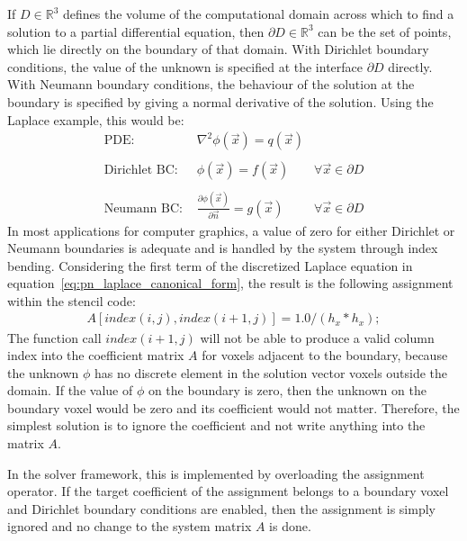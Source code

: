 If $D\in\mathbb{R}^3$ defines the volume of the computational domain across which to find a solution to a partial differential equation, then $\partial D\in\mathbb{R}^3$ can be the set of points, which lie directly on the boundary of that domain. With Dirichlet boundary conditions, the value of the unknown is specified at the interface $\partial D$ directly. With Neumann boundary conditions, the behaviour of the solution at the boundary is specified by giving a normal derivative of the solution. Using the Laplace example, this would be:
\begin{align*}
\text{PDE:\ \ } & \nabla^2\phi\left(\vec{x}\right) = q\left(\vec{x}\right)
&
\\
\\
\text{Dirichlet BC:\ \ } & \phi\left(\vec{x}\right) = f\left(\vec{x}\right)
&\forall \vec{x}\in\partial D
\\
\\
\text{Neumann BC:\ \ } & \frac{\partial\phi\left(\vec{x}\right)}{\partial\vec{n}} = g\left(\vec{x}\right)
&\forall \vec{x}\in\partial D
\end{align*}
In most applications for computer graphics, a value of zero for either Dirichlet or Neumann boundaries is adequate and is handled by the system through index bending. Considering the first term of the discretized Laplace equation in equation~\ref{eq:pn_laplace_canonical_form}, the result is the following assignment within the stencil code:
\begin{align}
A[index(i,j), index(i+1, j)] = 1.0/(h_x*h_x);
\end{align}
The function call $index(i+1, j)$ will not be able to produce a valid column index into the coefficient matrix $A$ for voxels adjacent to the boundary, because the unknown $\phi$ has no discrete element in the solution vector voxels outside the domain. If the value of $\phi$ on the boundary is zero, then the unknown on the boundary voxel would be zero and its coefficient would not matter. Therefore, the simplest solution is to ignore the coefficient and not write anything into the matrix $A$.

In the solver framework, this is implemented by overloading the assignment operator. If the target coefficient of the assignment belongs to a boundary voxel and Dirichlet boundary conditions are enabled, then the assignment is simply ignored and no change to the system matrix $A$ is done.

